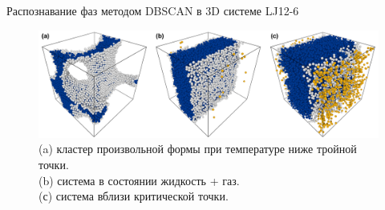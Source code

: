 \documentclass{beamer}
\begin{document}
\begin{frame}{Распознавание фаз методом DBSCAN в 3D системе LJ12-6}
\footnotesize{
\begin{figure}[!t]
    \centering
    \includegraphics[width=\linewidth]{PRIMe-Figure103.png}
    \caption{(a) кластер произвольной формы при температуре ниже тройной точки. \\
    (b) система в состоянии жидкость + газ. \\
    (с) система вблизи критической точки.}
    \label{D3_free_conf}
\end{figure}
}

\end{frame}
\end{document}
